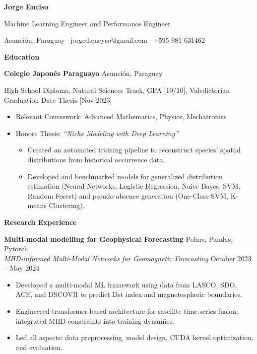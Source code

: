 \documentclass[11pt]{article}
\begin{document}
\begin{center}
    \textbf{Jorge Enciso}\\
    \begin{center}
        Machine Learning Engineer and Performance Engineer
    \end{center}
    \hrulefill
\end{center}

\begin{center}
    Asunción, Paraguay \textbullet \ jorged.encyso@gmail.com \textbullet \ +595 981 631462
\end{center}

\vspace{0.5pt}

\begin{center}
    \textbf{Education}
\end{center}
\textbf{Colegio Japonés Paraguayo} \hfill Asunción, Paraguay

High School Diploma, Natural Sciences Track, GPA [10/10], Valedictorian \hfill Graduation Date Thesis [Nov 2023]

\begin{itemize}%
    \item Relevant Coursework: Advanced Mathematics, Physics, Mechatronics
    \item Honors Thesis: \textit{“Niche Modeling with Deep Learning”}
        \begin{itemize}
            \item Created an automated training pipeline to reconstruct species’ spatial distributions from historical occurrence data.
            \item Developed and benchmarked models for generalized distribution estimation (Neural Networks, Logistic Regression, Naive Bayes, SVM, Random Forest) and pseudo-absence generation (One-Class SVM, K-means Clustering).
        \end{itemize}
\end{itemize}

\vspace{12pt}

\begin{center}
    \textbf{Research Experience}
\end{center}

\textbf{Multi-modal modelling for Geophysical Forecasting} \hfill Polars, Pandas, Pytorch \\
\textit{MHD-informed Multi-Modal Networks for Geomagnetic Forecasting} \hfill October 2023 – May 2024
\begin{itemize}[noitemsep]
    \item Developed a multi-modal ML framework using data from LASCO, SDO, ACE, and DSCOVR to predict Dst index and magnetospheric boundaries.
    \item Engineered transformer-based architecture for satellite time series fusion; integrated MHD constraints into training dynamics.
    \item Led all aspects: data preprocessing, model design, CUDA kernel optimization, and evaluation.
\end{itemize}
\end{document}

